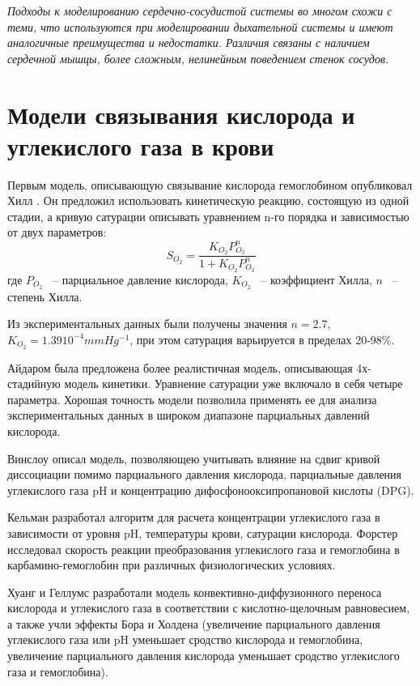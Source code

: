 \textit{Подходы к моделированию сердечно-сосудистой системы во многом схожи с теми, что используются при моделировании дыхательной системы и имеют аналогичные преимущества и недостатки. Различия связаны с наличием сердечной мышцы, более сложным, нелинейным поведением стенок сосудов.}


\section{Модели связывания кислорода и углекислого газа в крови}
Первым модель, описывающую связывание кислорода гемоглобином опубликовал Хилл \cite{Hill1910}. Он предложил использовать кинетическую реакцию, состоящую из одной стадии, а кривую сатурации описывать уравнением  n-го порядка и зависимостью от двух параметров:
\begin{equation}
S_{O_{2}} = \frac{K_{O_{2}}P_{O_{2}}^{n}}{1+K_{O_{2}}P_{O_{2}}^{n}}
\end{equation}
где $P_{O_{2}}$ ~-- парциальное давление кислорода, $K_{O_{2}}$ ~-- коэффициент Хилла, $n$ ~-- степень Хилла.

Из экспериментальных данных были получены значения $n=2.7$, $K_{O_{2}}=1.39 10^{-4}  mmHg^{-1}$, при этом сатурация варьируется в пределах 20-98\%. 

Айдаром \cite{Adair1925} была предложена более реалистичная модель, описывающая 4х- стадийную модель кинетики. Уравнение сатурации уже включало в себя четыре параметра. Хорошая точность модели позволила применять ее для анализа экспериментальных данных в широком диапазоне парциальных давлений кислорода. 

Винслоу \cite{Winslow1983} описал модель, позволяющею учитывать влияние на сдвиг кривой диссоциации помимо парциального давления кислорода, парциальные давления углекислого газа pH и концентрацию дифосфонооксипропановой кислоты (DPG).   

Кельман \cite{Kelman1966} разработал алгоритм для расчета концентрации углекислого газа в зависимости от уровня pH, температуры крови, сатурации кислорода. Форстер исследовал скорость реакции преобразования углекислого газа и гемоглобина в карбамино-гемоглобин при различных физиологических условиях. 

Хуанг и Геллумс \cite{Huang1994} разработали модель конвективно-диффузионного переноса кислорода и углекислого газа в соответствии с кислотно-щелочным равновесием, а также учли эффекты Бора и Холдена (увеличение парциального давления углекислого газа или pH уменьшает сродство кислорода и гемоглобина, увеличение парциального давления кислорода уменьшает сродство углекислого газа и гемоглобина). 

